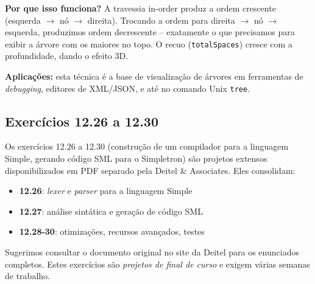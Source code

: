 \documentclass[12pt,a4paper]{article}
\begin{document}
\begin{respostabox}
\textbf{Por que isso funciona?} A travessia in-order produz a ordem crescente
(esquerda $\to$ nó $\to$ direita). Trocando a ordem para direita $\to$ nó $\to$
esquerda, produzimos ordem decrescente -- exatamente o que precisamos para
exibir a árvore com os maiores no topo. O recuo (\texttt{totalSpaces}) cresce
com a profundidade, dando o efeito 3D.

\textbf{Aplicações:} esta técnica é a base de visualização de árvores em
ferramentas de \textit{debugging}, editores de XML/JSON, e até no comando Unix
\texttt{tree}.
\end{respostabox}

\subsection*{Exercícios 12.26 a 12.30}

\begin{respostabox}
Os exercícios 12.26 a 12.30 (construção de um compilador para a linguagem Simple,
gerando código SML para o Simpletron) são projetos extensos disponibilizados em
PDF separado pela Deitel \& Associates. Eles consolidam:

\begin{itemize}[noitemsep]
  \item \textbf{12.26}: \textit{lexer} e \textit{parser} para a linguagem Simple
  \item \textbf{12.27}: análise sintática e geração de código SML
  \item \textbf{12.28-30}: otimizações, recursos avançados, testes
\end{itemize}

Sugerimos consultar o documento original no site da Deitel para os enunciados
completos. Estes exercícios são \textit{projetos de final de curso} e exigem
várias semanas de trabalho.
\end{respostabox}
\end{document}
